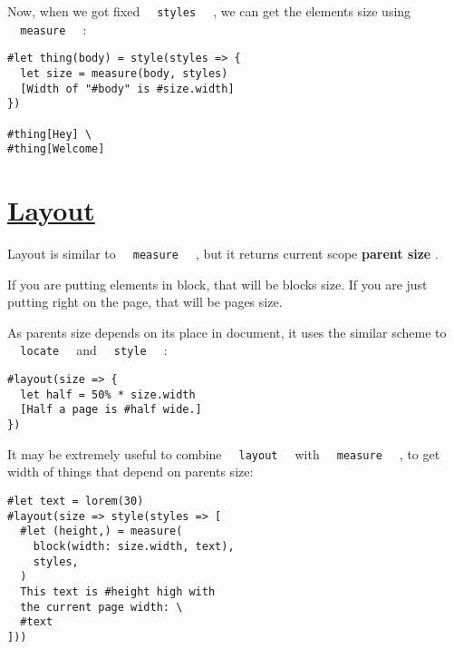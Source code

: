 Now, when we got fixed \texttt{\ }{\texttt{\ styles\ }}\texttt{\ } , we
can get the element\textquotesingle s size using
\texttt{\ }{\texttt{\ measure\ }}\texttt{\ } :

\begin{verbatim}
#let thing(body) = style(styles => {
  let size = measure(body, styles)
  [Width of "#body" is #size.width]
})

#thing[Hey] \
#thing[Welcome]
\end{verbatim}

\pandocbounded{}

\section{\texorpdfstring{\hyperref[layout]{Layout}}{Layout}}\label{layout}

Layout is similar to \texttt{\ }{\texttt{\ measure\ }}\texttt{\ } , but
it returns current scope \textbf{parent size} .

If you are putting elements in block, that will be
block\textquotesingle s size. If you are just putting right on the page,
that will be page\textquotesingle s size.

As parent\textquotesingle s size depends on it\textquotesingle s place
in document, it uses the similar scheme to
\texttt{\ }{\texttt{\ locate\ }}\texttt{\ } and
\texttt{\ }{\texttt{\ style\ }}\texttt{\ } :

\begin{verbatim}
#layout(size => {
  let half = 50% * size.width
  [Half a page is #half wide.]
})
\end{verbatim}

\pandocbounded{}

It may be extremely useful to combine
\texttt{\ }{\texttt{\ layout\ }}\texttt{\ } with
\texttt{\ }{\texttt{\ measure\ }}\texttt{\ } , to get width of things
that depend on parent\textquotesingle s size:

\begin{verbatim}
#let text = lorem(30)
#layout(size => style(styles => [
  #let (height,) = measure(
    block(width: size.width, text),
    styles,
  )
  This text is #height high with
  the current page width: \
  #text
]))
\end{verbatim}

\pandocbounded{}
